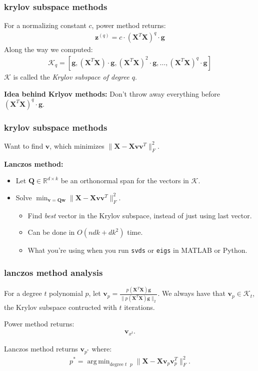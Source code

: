 \documentclass[compress]{beamer}
\newcommand{\bv}[1]{\mathbf{#1}}
\newcommand{\R}{\mathbb{R}}
\DeclareMathOperator*{\argmin}{arg\,min}
\begin{document}
\begin{frame}[t]
	\frametitle{krylov subspace methods}
	For a normalizing constant $c$, power method returns:
	\begin{align*}
		\bv{z}^{(q)} = c \cdot \left(\bv{X}^T\bv{X}\right)^q \cdot \bv{g}
	\end{align*}
	Along the way we computed:
	\begin{align*}
		\mathcal{K}_q = \left[\bv{g}, \left(\bv{X}^T\bv{X}\right) \cdot \bv{g}, \left(\bv{X}^T\bv{X}\right)^2 \cdot \bv{g}, \ldots, \left(\bv{X}^T\bv{X}\right)^q \cdot \bv{g}\right]
	\end{align*}
	$\mathcal{K}$ is called the  \emph{Krylov subspace of degree $q$}. 
	
	\vspace{2em}
	\textbf{Idea behind Krlyov methods:} Don't throw away everything before $\left(\bv{X}^T\bv{X}\right)^q \cdot \bv{g}$. 
\end{frame}

\begin{frame}[t]
	\frametitle{krylov subspace methods}
	\begin{center}
		Want to find $\bv{v}$, which minimizes $\|\bv{X} - \bv{X}\bv{v}\bv{v}^T\|_F^2$.
	\end{center}
	
	\textbf{Lanczos method:}
	\begin{itemize}
		\item Let $\bv{Q} \in \R^{d\times k}$ be an orthonormal span for the vectors in $\mathcal{K}$. 
		\item Solve $\min_{\bv{v} = \bv{Q}\bv{w}} \|\bv{X} - \bv{X}\bv{v}\bv{v}^T\|_F^2$. 
		\begin{itemize}
			\item Find \emph{best} vector in the Krylov subspace, instead of just using last vector.
			\item Can be done in $O\left(ndk + dk^2\right)$ time. 
			\item What you're using when you run \texttt{svds} or \texttt{eigs} in MATLAB or Python.
		\end{itemize}
	\end{itemize}
\end{frame}

\begin{frame}[t]
	\frametitle{lanczos method analysis}
	For a degree $t$ polynomial $p$, let $\bv{v}_p = \frac{p(\bv{X}^T\bv{X})\bv{g}}{\|p(\bv{X}^T\bv{X})\bv{g}\|_2}$. We always have that $\bv{v}_p \in \mathcal{K}_t$, the Krylov subspace contructed with $t$ iterations.
		
	Power method returns:
	\begin{align*}
		\bv{v}_{x^t}.
	\end{align*}

	Lanczos method returns 	$\bv{v}_{p^*}$ where:
	\begin{align*}
		p^* = \argmin_{\text{degree $t$ } p} \|\bv{X} - \bv{X}\bv{v}_p\bv{v}_p^T\|_F^2.
	\end{align*}
\end{frame}
\end{document}
